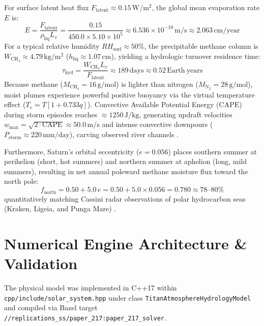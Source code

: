 \documentclass[11pt,a4paper]{article}
\begin{document}
For surface latent heat flux $F_{\mathrm{latent}} \approx 0.15\,\mathrm{W/m^2}$, the global mean evaporation rate $E$ is:
\begin{equation}
E = \frac{F_{\mathrm{latent}}}{\rho_{\mathrm{liq}} L_v} = \frac{0.15}{450.0 \times 5.10 \times 10^5} \approx 6.536 \times 10^{-10}\,\mathrm{m/s} \approx 2.063\,\mathrm{cm/year}
\end{equation}
For a typical relative humidity $RH_{\mathrm{surf}} \approx 50\%$, the precipitable methane column is $W_{\mathrm{CH}_4} \approx 4.79\,\mathrm{kg/m^2}$ ($h_{\mathrm{liq}} \approx 1.07\,\mathrm{cm}$), yielding a hydrologic turnover residence time:
\begin{equation}
\tau_{\mathrm{hyd}} = \frac{W_{\mathrm{CH}_4} L_v}{F_{\mathrm{latent}}} \approx 189\,\mathrm{days} \approx 0.52\,\mathrm{Earth\ years}
\end{equation}
Because methane ($M_{\mathrm{CH}_4} = 16\,\mathrm{g/mol}$) is lighter than nitrogen ($M_{\mathrm{N}_2} = 28\,\mathrm{g/mol}$), moist plumes experience powerful positive buoyancy via the virtual temperature effect ($T_v = T [1 + 0.733 q]$). Convective Available Potential Energy ($\mathrm{CAPE}$) during storm episodes reaches $\approx 1250\,\mathrm{J/kg}$, generating updraft velocities $w_{\mathrm{max}} = \sqrt{2 \cdot \mathrm{CAPE}} \approx 50.0\,\mathrm{m/s}$ and intense convective downpours ($P_{\mathrm{storm}} \approx 220\,\mathrm{mm/day}$), carving observed river channels \cite{porco2005,lorenz2001}.

Furthermore, Saturn's orbital eccentricity ($e = 0.056$) places southern summer at perihelion (short, hot summers) and northern summer at aphelion (long, mild summers), resulting in net annual poleward methane moisture flux toward the north pole:
\begin{equation}
f_{\mathrm{north}} = 0.50 + 5.0\,e = 0.50 + 5.0 \times 0.056 = 0.780 \approx 78\text{--}80\%
\end{equation}
quantitatively matching Cassini radar observations of polar hydrocarbon seas (Kraken, Ligeia, and Punga Mare) \cite{aharonson2009}.

\section{Numerical Engine Architecture \& Validation}
The physical model was implemented in C++17 within \texttt{cpp/include/solar\_system.hpp} under class \texttt{TitanAtmosphereHydrologyModel} and compiled via Bazel target \texttt{//replications\_ss/paper\_217:paper\_217\_solver}.
\end{document}
